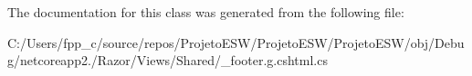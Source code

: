 The documentation for this class was generated from the following file\+:\begin{DoxyCompactItemize}
\item 
C\+:/\+Users/fpp\+\_\+c/source/repos/\+Projeto\+E\+S\+W/\+Projeto\+E\+S\+W/\+Projeto\+E\+S\+W/obj/\+Debug/netcoreapp2./\+Razor/\+Views/\+Shared/\+\_\+footer.\+g.\+cshtml.\+cs\end{DoxyCompactItemize}

